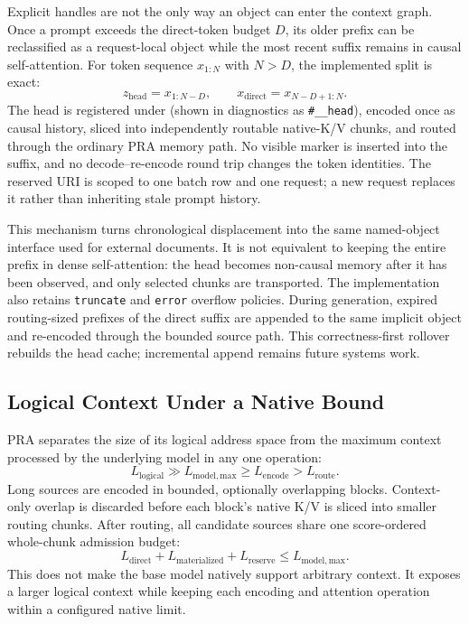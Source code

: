 \documentclass[11pt]{article}
\begin{document}
Explicit handles are not the only way an object can enter the context graph.  Once a
prompt exceeds the direct-token budget $D$, its older prefix can be reclassified as a
request-local object while the most recent suffix remains in causal self-attention.  For
token sequence $x_{1:N}$ with $N>D$, the implemented split is exact:
\begin{equation}
z_{\mathrm{head}}=x_{1:N-D},\qquad x_{\mathrm{direct}}=x_{N-D+1:N}.
\end{equation}
The head is registered under  (shown in diagnostics as
\texttt{\#\_\_head}), encoded once as causal history, sliced into independently routable
native-K/V chunks, and routed through the ordinary PRA memory path.
No visible marker is inserted into the suffix, and no decode--re-encode round trip changes
the token identities.  The reserved URI is scoped to one batch row and one request; a new
request replaces it rather than inheriting stale prompt history.

This mechanism turns chronological displacement into the same named-object interface used
for external documents.  It is not equivalent to keeping the entire prefix in dense
self-attention: the head becomes non-causal memory after it has been observed, and only
selected chunks are transported.  The implementation also retains \texttt{truncate} and
\texttt{error} overflow policies. During generation, expired routing-sized prefixes of
the direct suffix are appended to the same implicit object and re-encoded through the
bounded source path. This correctness-first rollover rebuilds the head cache;
incremental append remains future systems work.

\subsection{Logical Context Under a Native Bound}

PRA separates the size of its logical address space from the maximum context processed by
the underlying model in any one operation:
\begin{equation}
L_{\mathrm{logical}} \gg L_{\mathrm{model,max}}
\ge L_{\mathrm{encode}} > L_{\mathrm{route}}.
\end{equation}
Long sources are encoded in bounded, optionally overlapping blocks. Context-only overlap
is discarded before each block's native K/V is sliced into smaller routing chunks. After
routing, all candidate sources share one score-ordered whole-chunk admission budget:
\begin{equation}
L_{\mathrm{direct}}+L_{\mathrm{materialized}}+L_{\mathrm{reserve}}
\le L_{\mathrm{model,max}}.
\end{equation}
This does not make the base model natively support arbitrary context. It exposes a larger
logical context while keeping each encoding and attention operation within a configured
native limit.
\end{document}
